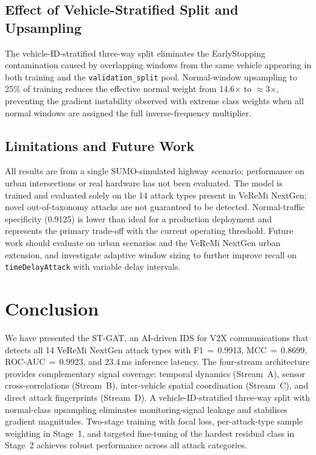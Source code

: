 \documentclass[conference]{IEEEtran}
\begin{document}
\subsection{Effect of Vehicle-Stratified Split and Upsampling}

The vehicle-ID-stratified three-way split eliminates the EarlyStopping
contamination caused by overlapping windows from the same vehicle appearing
in both training and the \texttt{validation\_split} pool.  Normal-window
upsampling to 25\% of training reduces the effective normal weight from
14.6$\times$ to $\approx$3$\times$, preventing the gradient instability
observed with extreme class weights when all normal windows are assigned
the full inverse-frequency multiplier.

\subsection{Limitations and Future Work}

All results are from a single SUMO-simulated highway scenario; performance
on urban intersections or real hardware has not been evaluated.  The model
is trained and evaluated solely on the 14 attack types present in VeReMi
NextGen; novel out-of-taxonomy attacks are not guaranteed to be detected.
Normal-traffic specificity (0.9125) is lower than ideal for a
production deployment and represents the primary trade-off with the
current operating threshold.  Future work should evaluate on urban
scenarios and the VeReMi NextGen urban extension, and investigate adaptive
window sizing to further improve recall on \texttt{timeDelayAttack} with
variable delay intervals.

\section{Conclusion}
\label{sec:conclusion}

We have presented the ST-GAT, an AI-driven IDS for V2X communications
that detects all 14 VeReMi NextGen attack types with
F1\,$=$\,0.9913, MCC\,$=$\,0.8699, ROC-AUC\,$=$\,0.9923, and
23.4\,ms inference latency.  The four-stream architecture provides
complementary signal coverage: temporal dynamics (Stream~A), sensor
cross-correlations (Stream~B), inter-vehicle spatial coordination
(Stream~C), and direct attack fingerprints (Stream~D).  A
vehicle-ID-stratified three-way split with normal-class upsampling
eliminates monitoring-signal leakage and stabilises gradient magnitudes.
Two-stage training with focal loss, per-attack-type sample weighting in
Stage~1, and targeted fine-tuning of the hardest residual class in
Stage~2 achieves robust performance across all attack categories.
\end{document}
